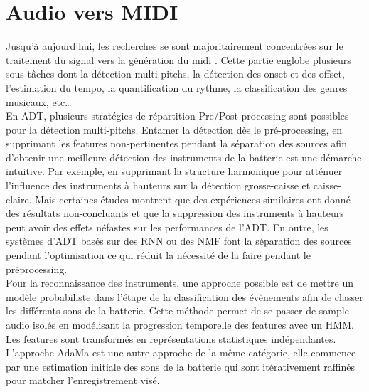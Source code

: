 \section{Audio vers MIDI}
Jusqu’à aujourd’hui, les recherches se sont majoritairement concentrées sur le traitement du signal vers la génération du midi \cite{AMT_for_2_Instru}. Cette partie englobe plusieurs sous-tâches dont la détection multi-pitchs, la détection des onset et des offset, l'estimation du tempo, la quantification du rythme, la classification des genres musicaux, etc…\\
En ADT\cite{Review_ADT}, plusieurs stratégies de répartition Pre/Post-processing sont possibles pour la détection multi-pitchs. Entamer la détection dès le pré-processing, en supprimant les features non-pertinentes pendant la séparation des sources afin d’obtenir une meilleure détection des instruments de la batterie est une démarche intuitive. Par exemple, en supprimant la structure harmonique pour atténuer l’influence des instruments à hauteurs sur la détection grosse-caisse et caisse-claire. Mais certaines études montrent que des expériences similaires ont donné des résultats non-concluants et que la suppression des instruments à hauteurs peut avoir des effets néfastes sur les performances de l’ADT. En outre, les systèmes d’ADT basés sur des RNN ou des NMF font la séparation des sources pendant l’optimisation ce qui réduit la nécessité de la faire pendant le préprocessing.\\
Pour la reconnaissance des instruments, une approche possible\cite{Eronen} est de mettre un modèle probabiliste dans l’étape de la classification des évènements afin de classer les différents sons de la batterie. Cette méthode permet de se passer de sample audio isolés en modélisant la progression temporelle des features avec un HMM. Les features sont transformés en représentations statistiques indépendantes.
L’approche AdaMa\cite{adama_1} est une autre approche de la même catégorie, elle commence par une estimation initiale des sons de la batterie qui sont itérativement raffinés pour matcher l’enregistrement visé.\\
